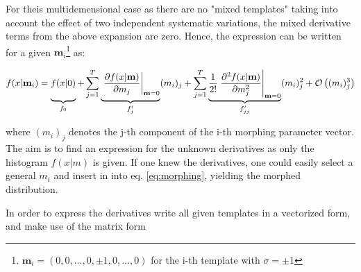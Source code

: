 For theis multidemensional case as there are no "mixed templates" taking into account the effect of two independent systematic variations, the mixed derivative terms from the above expansion are zero. Hence, the expression can be written for a given $\mathbf{m}_i$\footnote{$\mathbf{m}_i = (0, 0, ..., 0, \pm 1, 0, ..., 0)$ for the i-th template with $\sigma=\pm1$} as:

\begin{equation}
	f(x | \mathbf{m}_i) = \underbrace{\vphantom{\frac{1}{2!}\left.\frac{\partial^2 f(x | \mathbf{m})}{\partial m_j^2}\right|_{\mathbf{m}=0}}f(x | 0)}_{f_0} + \sum^T_{j=1} \underbrace{\vphantom{\frac{1}{2!}\left.\frac{\partial^2 f(x | \mathbf{m})}{\partial m_j^2}\right|_{\mathbf{m}=0}}\left.\frac{\partial f(x | \mathbf{m})}{\partial m_j}\right|_{\mathbf{m}=0}}_{f'_j}(m_i)_j + \sum^T_{j=1} \underbrace{\frac{1}{2!}\left.\frac{\partial^2 f(x | \mathbf{m})}{\partial m_j^2}\right|_{\mathbf{m}=0}}_{f'_{jj}}(m_i)^2_j + \mathcal{O}\left((m_i)_j^3\right)
	\label{eq:morphing}
\end{equation}

where $(m_i)_j$ denotes the j-th component of the i-th morphing parameter vector. The aim is to find an expression for the unknown derivatives as only the histogram $f(x|m)$ is given. If one knew the derivatives, one could easily select a general $m_i$ and insert in into eq. \ref{eq:morphing}, yielding the morphed distribution.

In order to express the derivatives write all given templates in a vectorized form, and make use of the matrix form

